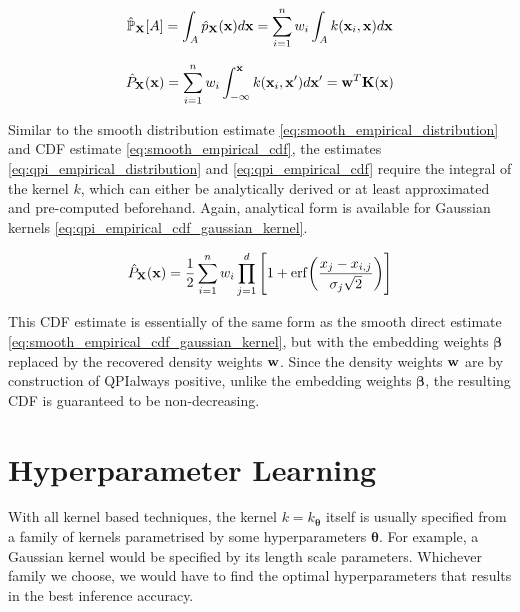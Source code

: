 \documentclass[twoside]{article} \usepackage{aistats2017}
\theoremstyle{definition}
\theoremstyle{theorem}
\newcommand{\rv}[1]{{#1}}
\newcommand{\qpi}{QPI}
\begin{document}
	\begin{equation}
		\hat{\mathbb{P}}_{\bvec{\rv{X}}}[A] = \int_{A} \hat{p}_{\bvec{\rv{X}}}(\bvec{x}) d\bvec{x} = \sum_{i = 1}^{n} w_{i} \int_{A} k(\bvec{x}_{i}, \bvec{x}) d\bvec{x}
	\label{eq:qpi_empirical_distribution}
	\end{equation}
	
	\begin{equation}
		\hat{P}_{\bvec{\rv{X}}}(\bvec{x}) = \sum_{i = 1}^{n} w_{i} \int_{-\bvec{\infty}}^{\bvec{x}} k(\bvec{x}_{i}, \bvec{x}') d\bvec{x}' =  \bvec{w}^{T} \bvec{K}(\bvec{x})
	\label{eq:qpi_empirical_cdf}
	\end{equation}
	
	Similar to the smooth distribution estimate \eqref{eq:smooth_empirical_distribution} and CDF estimate \eqref{eq:smooth_empirical_cdf}, the estimates \eqref{eq:qpi_empirical_distribution} and \eqref{eq:qpi_empirical_cdf} require the integral of the kernel $k$, which can either be analytically derived or at least approximated and pre-computed beforehand. Again, analytical form is available for Gaussian kernels \eqref{eq:qpi_empirical_cdf_gaussian_kernel}.
	
	\begin{equation}
		\hat{P}_{\bvec{\rv{X}}}(\bvec{x}) = \frac{1}{2} \sum_{i = 1}^{n} w_{i} \prod_{j = 1}^{d} \Bigg[1 + \mathrm{erf}\bigg(\frac{x_{j} - x_{i, j}}{\sigma_{j} \sqrt{2}}\bigg)\Bigg]
	\label{eq:qpi_empirical_cdf_gaussian_kernel}
	\end{equation}
	
	This CDF estimate is essentially of the same form as the smooth direct estimate \eqref{eq:smooth_empirical_cdf_gaussian_kernel}, but with the embedding weights $\bm{\beta}$ replaced by the recovered density weights $\mathbf{w}$. Since the density weights $\mathbf{w}$ are by construction of \qpi\space always positive, unlike the embedding weights $\bm{\beta}$, the resulting CDF is guaranteed to be non-decreasing.
 
\section{Hyperparameter Learning}
\label{sec:hyperparameter_learning}

	With all kernel based techniques, the kernel $k = k_{\bm{\theta}}$ itself is usually specified from a family of kernels parametrised by some hyperparameters $\bm{\theta}$. For example, a Gaussian kernel would be specified by its length scale parameters. Whichever family we choose, we would have to find the optimal hyperparameters that results in the best inference accuracy. %
	
\end{document}
